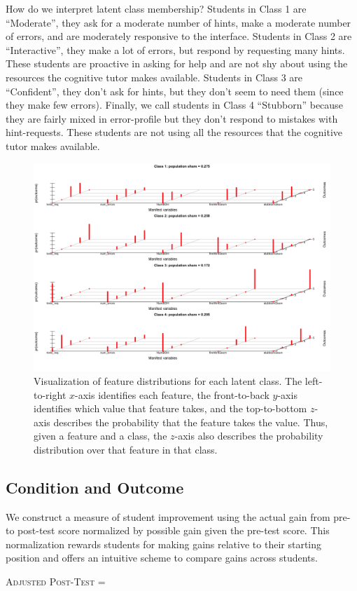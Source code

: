 \documentclass{edm_template}
\begin{document}
How do we interpret latent class membership? Students in Class 1 are ``Moderate'', they ask for a moderate number of hints, make a moderate number of errors, and are moderately responsive to the interface. Students in Class 2 are ``Interactive'', they make a lot of errors, but respond by requesting many hints. These students are proactive in asking for help and are not shy about using the resources the cognitive tutor makes available. Students in Class 3 are ``Confident'', they don't ask for hints, but they don't seem to need them (since they make few errors). Finally, we call students in Class 4 ``Stubborn'' because they are fairly mixed in error-profile but they don't respond to mistakes with hint-requests. These students are not using all the resources that the cognitive tutor makes available.

\begin{figure}[htbp]
\centering
\includegraphics[scale=0.4]{lca-class-viz.png}
\caption{Visualization of feature distributions for each latent class. The left-to-right $x$-axis identifies each feature, the front-to-back $y$-axis identifies which value that feature takes, and the top-to-bottom $z$-axis describes the probability that the feature takes the value. Thus, given a feature and a class, the $z$-axis also describes the probability distribution over that feature in that class.}
\label{fig:lca-class-viz}
\end{figure}


\subsection{Condition and Outcome} 
We construct a measure of student improvement using the actual gain from pre- to post-test score normalized by possible gain given the pre-test score. This normalization rewards students for making gains relative to their starting position and offers an intuitive scheme to compare gains across students.
\begin{center}
\textsc{Adjusted Post-Test} = 
\end{center}
\end{document}
